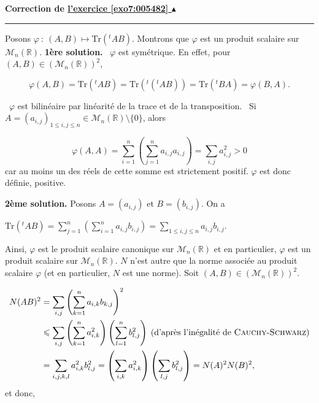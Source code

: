 \documentclass[11pt,a4paper]{article}
\newcommand{\Rr}{\mathbb{R}} \newcommand{\R}{\mathbb{R}}
\newcommand{\finexercice}{}
\newcommand{\noindication}{}
\newcounter{exo}
\newcommand{\correction}[1]{\hypertarget{cor7:#1}{}\label{cor7:#1}{\bf Correction de \hyperlink{exo7:#1}{l'exercice \ref{exo7:#1} $\blacktriangle$}}\vspace{1mm}\hrule\vspace{1mm}}
\newcommand{\finenonces}{\newpage}
\newcommand{\finindications}{\newpage}
\begin{document}
\finexercice
\finfiche


 \finenonces 



 \finindications 

\noindication
\noindication
\noindication
\noindication
\noindication
\noindication
\noindication
\noindication
\noindication
\noindication
\noindication
\noindication
\noindication
\noindication
\noindication
\noindication
\noindication
\noindication
\noindication


\newpage

\correction{005482}
Posons $\varphi~:~(A,B)\mapsto\mbox{Tr}({^t}AB)$. Montrons que $\varphi$ est un produit scalaire sur $\mathcal{M}_n(\Rr)$. 
\textbf{1ère solution.} \textbullet~$\varphi$ est symétrique. En effet, pour $(A,B)\in(\mathcal{M}_n(\Rr))^2$,

$$\varphi(A,B)=\mbox{Tr}(^{t}AB)=\mbox{Tr}({^t}({^t}AB))=\mbox{Tr}({^t}BA)=\varphi(B,A).$$

\textbullet~$\varphi$ est bilinéaire par linéarité de la trace et de la transposition.
\textbullet~Si $A=(a_{i,j})_{1\leq i,j\leq n}\in\mathcal{M}_n(\Rr)\setminus\{0\}$, alors

$$\varphi(A,A)=\sum_{i=1}^{n}\left(\sum_{j=1}^{n}a_{i,j}a_{i,j}\right)=\sum_{i,j}^{}a_{i,j}^2>0$$
car au moins un des réels de cette somme est strictement positif. $\varphi$ est donc définie, positive.

\textbf{2ème solution.} Posons $A=(a_{i,j})$ et $B=(b_{i,j})$. On a

\begin{center}
$\text{Tr}({^t}AB)=\sum_{j=1}^{n}\left(\sum_{i=1}^{n}a_{i,j}b_{i,j}\right)=\sum_{1\leq i,j\leq n}^{}a_{i,j}b_{i,j}$.
\end{center}
Ainsi, $\varphi$ est le produit scalaire canonique sur $\mathcal{M}_n(\Rr)$ et en particulier, $\varphi$ est un produit scalaire sur $\mathcal{M}_n(\Rr)$.
$N$ n'est autre que la norme associée au produit scalaire $\varphi$ (et en particulier, $N$ est une norme).
Soit $(A,B)\in(\mathcal{M}_n(\Rr))^2$.

\begin{align*}\ensuremath
N(AB)^2&=\sum_{i,j}^{}\left(\sum_{k=1}^{n}a_{i,k}b_{k,j}\right)^2\\
 &\leq\sum_{i,j}^{}\left(\sum_{k=1}^{n}a_{i,k}^2\right)\left(\sum_{l=1}^{n}b_{l,j}^2\right)\;(\mbox{d'après l'inégalité de \textsc{Cauchy}-\textsc{Schwarz}})\\
 &=\sum_{i,j,k,l}^{}a_{i,k}^2b_{l,j}^2=\left(\sum_{i,k}^{}a_{i,k}^2\right)\left(\sum_{l,j}^{}b_{l,j}^2\right)=N(A)^2N(B)^2,
\end{align*}
et donc,
\end{document}
